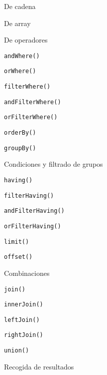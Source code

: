 \begin{longenum}
\begin{longenum}
\begin{longenum}
\begin{longenum}
\begin{longenum}
                    \begin{longenum}
                        \item De cadena
                        \item De array
                        \item De operadores
                    \end{longenum}
                    \item \texttt{andWhere()}
                    \item \texttt{orWhere()}
                    \item \texttt{filterWhere()}
                    \item \texttt{andFilterWhere()}
                    \item \texttt{orFilterWhere()}
                \end{longenum}
                \item \texttt{orderBy()}
                \item \texttt{groupBy()}
                \item Condiciones y filtrado de grupos
                \begin{longenum}
                    \item \texttt{having()}
                    \item \texttt{filterHaving()}
                    \item \texttt{andFilterHaving()}
                    \item \texttt{orFilterHaving()}
                \end{longenum}
                \item \texttt{limit()}
                \item \texttt{offset()}
                \item Combinaciones
                \begin{longenum}
                    \item \texttt{join()}
                    \item \texttt{innerJoin()}
                    \item \texttt{leftJoin()}
                    \item \texttt{rightJoin()}
                \end{longenum}
                \item \texttt{union()}
            \end{longenum}
            \item Recogida de resultados

\end{longenum}
\end{longenum}
\end{longenum}
